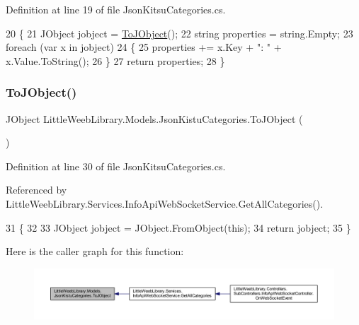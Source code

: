 Definition at line 19 of file Json\+Kitsu\+Categories.\+cs.


\begin{DoxyCode}
20         \{
21             JObject jobject = \mbox{\hyperlink{class_little_weeb_library_1_1_models_1_1_json_kistu_categories_aa4fa8f73a8a500c0ee4238329c2dd8f8}{ToJObject}}();
22             \textcolor{keywordtype}{string} properties = \textcolor{keywordtype}{string}.Empty;
23             \textcolor{keywordflow}{foreach} (var x \textcolor{keywordflow}{in} jobject)
24             \{
25                 properties += x.Key + \textcolor{stringliteral}{": "} + x.Value.ToString();
26             \}
27             \textcolor{keywordflow}{return} properties;
28         \}
\end{DoxyCode}
\mbox{\label{class_little_weeb_library_1_1_models_1_1_json_kistu_categories_aa4fa8f73a8a500c0ee4238329c2dd8f8}} 
\subsubsection{\texorpdfstring{To\+J\+Object()}{ToJObject()}}
{\footnotesize\ttfamily J\+Object Little\+Weeb\+Library.\+Models.\+Json\+Kistu\+Categories.\+To\+J\+Object (\begin{DoxyParamCaption}{ }\end{DoxyParamCaption})}



Definition at line 30 of file Json\+Kitsu\+Categories.\+cs.



Referenced by Little\+Weeb\+Library.\+Services.\+Info\+Api\+Web\+Socket\+Service.\+Get\+All\+Categories().


\begin{DoxyCode}
31         \{
32 
33             JObject jobject = JObject.FromObject(\textcolor{keyword}{this});
34             \textcolor{keywordflow}{return} jobject;
35         \}
\end{DoxyCode}
Here is the caller graph for this function\+:\nopagebreak
\begin{figure}[H]
\begin{center}
\leavevmode
\includegraphics[width=350pt]{class_little_weeb_library_1_1_models_1_1_json_kistu_categories_aa4fa8f73a8a500c0ee4238329c2dd8f8_icgraph}
\end{center}
\end{figure}


